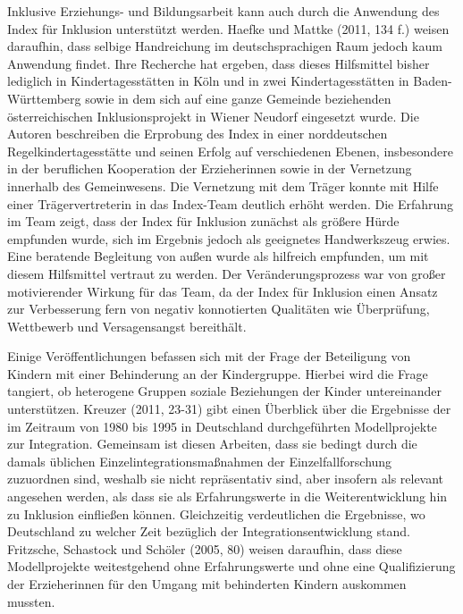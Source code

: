 Inklusive Erziehungs- und Bildungsarbeit kann auch durch die Anwendung des Index für Inklusion unterstützt werden. Haefke und Mattke (2011, 134 f.) weisen daraufhin, dass selbige Handreichung im deutschsprachigen Raum jedoch kaum Anwendung findet. Ihre Recherche hat ergeben, dass dieses Hilfsmittel bisher lediglich in Kindertagesstätten in Köln und in zwei Kindertagesstätten in Baden-Württemberg sowie in dem sich auf eine ganze Gemeinde beziehenden österreichischen Inklusionsprojekt in Wiener Neudorf eingesetzt wurde. Die Autoren beschreiben die Erprobung des Index in einer norddeutschen Regelkindertagesstätte und seinen Erfolg auf verschiedenen Ebenen, insbesondere in der beruflichen Kooperation der Erzieherinnen sowie in der Vernetzung innerhalb des Gemeinwesens. Die Vernetzung mit dem Träger konnte mit Hilfe einer Trägervertreterin in das Index-Team deutlich erhöht werden. Die Erfahrung im Team zeigt, dass der Index für Inklusion zunächst als größere Hürde empfunden wurde, sich im Ergebnis jedoch als geeignetes Handwerkszeug erwies. Eine beratende Begleitung von außen wurde als hilfreich empfunden, um mit diesem Hilfsmittel vertraut zu werden. Der Veränderungsprozess war von großer motivierender Wirkung für das Team, da der Index für Inklusion einen Ansatz zur Verbesserung fern von negativ konnotierten Qualitäten wie Überprüfung, Wettbewerb und Versagensangst bereithält.

Einige Veröffentlichungen befassen sich mit der Frage der Beteiligung von Kindern mit einer Behinderung an der Kindergruppe. Hierbei wird die Frage tangiert, ob heterogene Gruppen soziale Beziehungen der Kinder untereinander unterstützen. Kreuzer (2011, 23-31) gibt einen Überblick über die Ergebnisse der im Zeitraum von 1980 bis 1995 in Deutschland durchgeführten Modellprojekte zur Integration. Gemeinsam ist diesen Arbeiten, dass sie bedingt durch die damals üblichen Einzelintegrationsmaßnahmen der Einzelfallforschung zuzuordnen sind, weshalb sie nicht repräsentativ sind, aber insofern als relevant angesehen werden, als dass sie als Erfahrungswerte in die Weiterentwicklung hin zu Inklusion einfließen können. Gleichzeitig verdeutlichen die Ergebnisse, wo Deutschland zu welcher Zeit bezüglich der Integrationsentwicklung stand. Fritzsche, Schastock und Schöler (2005, 80) weisen daraufhin, dass diese Modellprojekte weitestgehend ohne Erfahrungswerte und ohne eine Qualifizierung der Erzieherinnen für den Umgang mit behinderten Kindern auskommen mussten. 

